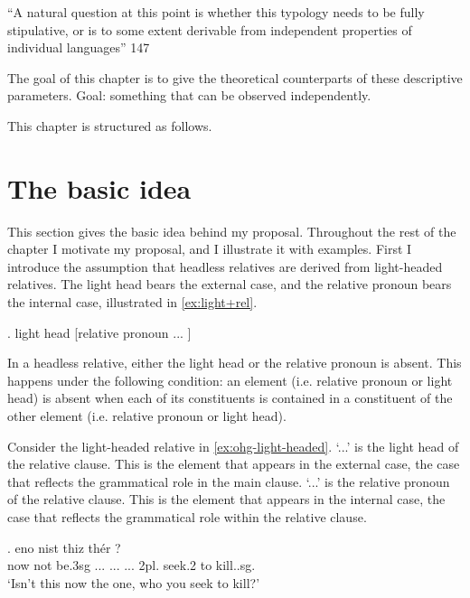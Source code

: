 ``A natural question at this point is whether this typology needs to be fully stipulative, or is to some extent derivable from independent properties of individual languages'' \citet{grosu1994}{147}

The goal of this chapter is to give the theoretical counterparts of these descriptive parameters. Goal: something that can be observed independently.

This chapter is structured as follows.


\section{The basic idea}\label{sec:basic-idea}

This section gives the basic idea behind my proposal. Throughout the rest of the chapter I motivate my proposal, and I illustrate it with examples.
First I introduce the assumption that headless relatives are derived from light-headed relatives. The light head bears the external case, and the relative pronoun bears the internal case, illustrated in \ref{ex:light+rel}.

\ex. light head [relative pronoun ... ]\label{ex:light+rel}

In a headless relative, either the light head or the relative pronoun is absent.
This happens under the following condition: an element (i.e. relative pronoun or light head) is absent when each of its constituents is contained in a constituent of the other element (i.e. relative pronoun or light head).

Consider the light-headed relative in \ref{ex:ohg-light-headed}.
 `...' is the light head of the relative clause. This is the element that appears in the external case, the case that reflects the grammatical role in the main clause.
 `...' is the relative pronoun of the relative clause. This is the element that appears in the internal case, the case that reflects the grammatical role within the relative clause.

\exg. eno nist thiz thér     ?\\
 now {not be.3\ac{sg}} ... ...
 ... 2\ac{pl}. seek.2 to kill..\ac{sg}.\\
 `Isn't this now the one, who you seek to kill?'\label{ex:ohg-light-headed}

